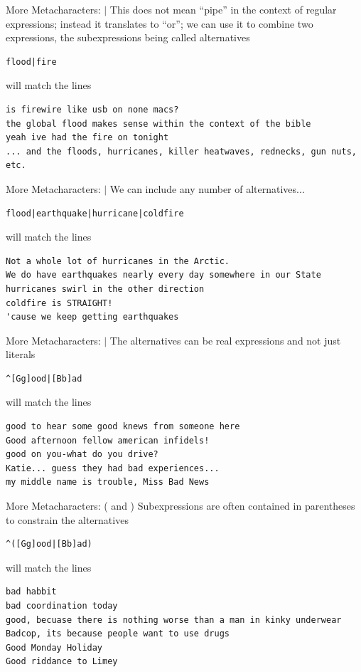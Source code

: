 \documentclass{beamer}
\begin{document}
\begin{frame}[fragile]{More Metacharacters: $|$}
This does not mean ``pipe'' in the context of regular expressions;
instead it translates to ``or''; we can use it to combine two
expressions, the subexpressions being called alternatives
\begin{verbatim}
flood|fire
\end{verbatim}
will match the lines 
\begin{verbatim}
is firewire like usb on none macs? 
the global flood makes sense within the context of the bible 
yeah ive had the fire on tonight 
... and the floods, hurricanes, killer heatwaves, rednecks, gun nuts, etc. 
\end{verbatim}
\end{frame}

\begin{frame}[fragile]{More Metacharacters: $|$}
We can include any number of alternatives...
\begin{verbatim}
flood|earthquake|hurricane|coldfire
\end{verbatim}
will match the lines 
\begin{verbatim}
Not a whole lot of hurricanes in the Arctic.
We do have earthquakes nearly every day somewhere in our State 
hurricanes swirl in the other direction 
coldfire is STRAIGHT! 
'cause we keep getting earthquakes
\end{verbatim}
\end{frame}

\begin{frame}[fragile]{More Metacharacters: $|$}
The alternatives can be real expressions and not just literals
\begin{verbatim}
^[Gg]ood|[Bb]ad
\end{verbatim}
will match the lines 
\begin{verbatim}
good to hear some good knews from someone here 
Good afternoon fellow american infidels! 
good on you-what do you drive? 
Katie... guess they had bad experiences... 
my middle name is trouble, Miss Bad News
\end{verbatim}
\end{frame}

\begin{frame}[fragile]{More Metacharacters: ( and )}
Subexpressions are often contained in parentheses to constrain the 
alternatives
\begin{verbatim}
^([Gg]ood|[Bb]ad)
\end{verbatim}
will match the lines 
\begin{verbatim}
bad habbit 
bad coordination today 
good, becuase there is nothing worse than a man in kinky underwear
Badcop, its because people want to use drugs 
Good Monday Holiday 
Good riddance to Limey
\end{verbatim}
\end{frame}
\end{document}
